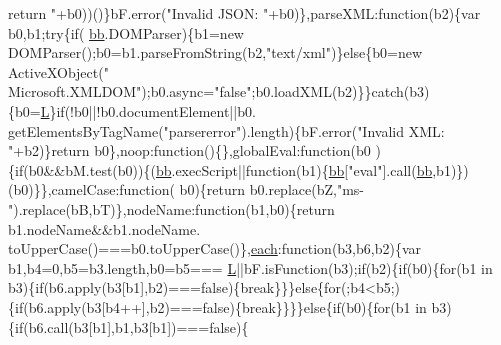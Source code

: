 \begin{DoxyCode}
{      return "}+b0))()\}bF.error(\textcolor{stringliteral}{"Invalid JSON: "}+b0)\},parseXML:\textcolor{keyword}{function}(b2)\{var b0,b1;\textcolor{keywordflow}{try}\{\textcolor{keywordflow}{if}(
      \hyperlink{docs_2_programmer's_manual_2html_2jquery_8js_a1d6558865876e1c8cca029fce41a4bdb}{bb}.DOMParser)\{b1=\textcolor{keyword}{new} DOMParser();b0=b1.parseFromString(b2,\textcolor{stringliteral}{"text/xml"})\}\textcolor{keywordflow}{else}\{b0=\textcolor{keyword}{new} ActiveXObject(\textcolor{stringliteral}{"
      Microsoft.XMLDOM"});b0.async=\textcolor{stringliteral}{"false"};b0.loadXML(b2)\}\}\textcolor{keywordflow}{catch}(b3)\{b0=\hyperlink{docs_2_programmer's_manual_2html_2jquery_8js_a38ee4c0b5f4fe2a18d0c783af540d253}{L}\}\textcolor{keywordflow}{if}(!b0||!b0.documentElement||b0.
      getElementsByTagName(\textcolor{stringliteral}{"parsererror"}).length)\{bF.error(\textcolor{stringliteral}{"Invalid XML: "}+b2)\}\textcolor{keywordflow}{return} b0\},noop:\textcolor{keyword}{function}()\{\},globalEval:\textcolor{keyword}{function}(b0
      )\{\textcolor{keywordflow}{if}(b0&&bM.test(b0))\{(\hyperlink{docs_2_programmer's_manual_2html_2jquery_8js_a1d6558865876e1c8cca029fce41a4bdb}{bb}.execScript||\textcolor{keyword}{function}(b1)\{\hyperlink{docs_2_programmer's_manual_2html_2jquery_8js_a1d6558865876e1c8cca029fce41a4bdb}{bb}[\textcolor{stringliteral}{"eval"}].call(\hyperlink{docs_2_programmer's_manual_2html_2jquery_8js_a1d6558865876e1c8cca029fce41a4bdb}{bb},b1)\})(b0)\}\},camelCase:\textcolor{keyword}{function}(
      b0)\{\textcolor{keywordflow}{return} b0.replace(bZ,\textcolor{stringliteral}{"ms-"}).replace(bB,bT)\},nodeName:\textcolor{keyword}{function}(b1,b0)\{\textcolor{keywordflow}{return} b1.nodeName&&b1.nodeName.
      toUpperCase()===b0.toUpperCase()\},\hyperlink{docs_2_programmer's_manual_2html_2jquery_8js_a871ff39db627c54c710a3e9909b8234c}{each}:\textcolor{keyword}{function}(b3,b6,b2)\{var b1,b4=0,b5=b3.length,b0=b5===
      \hyperlink{docs_2_programmer's_manual_2html_2jquery_8js_a38ee4c0b5f4fe2a18d0c783af540d253}{L}||bF.isFunction(b3);\textcolor{keywordflow}{if}(b2)\{\textcolor{keywordflow}{if}(b0)\{\textcolor{keywordflow}{for}(b1 in b3)\{\textcolor{keywordflow}{if}(b6.apply(b3[b1],b2)===\textcolor{keyword}{false})\{\textcolor{keywordflow}{break}\}\}\}\textcolor{keywordflow}{else}\{\textcolor{keywordflow}{for}(;b4<b5;)
      \{\textcolor{keywordflow}{if}(b6.apply(b3[b4++],b2)===\textcolor{keyword}{false})\{\textcolor{keywordflow}{break}\}\}\}\}\textcolor{keywordflow}{else}\{\textcolor{keywordflow}{if}(b0)\{\textcolor{keywordflow}{for}(b1 in b3)\{\textcolor{keywordflow}{if}(b6.call(b3[b1],b1,b3[b1])===\textcolor{keyword}{false})\{\textcolor{keywordflow}{
}
\end{DoxyCode}
